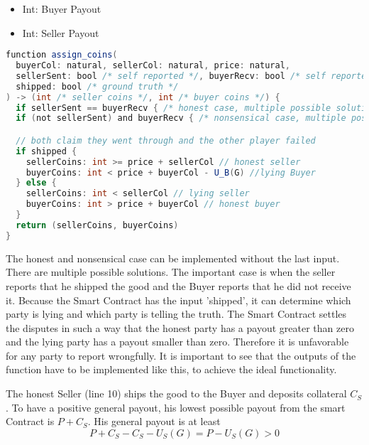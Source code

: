 \documentclass{cacthesis}
\begin{document}
\begin{itemize}
\item{Int: Buyer Payout}
\item{Int: Seller Payout}
\end{itemize}


\begin{lstlisting}[language=java]
function assign_coins(
  buyerCol: natural, sellerCol: natural, price: natural,
  sellerSent: bool /* self reported */, buyerRecv: bool /* self reported */, 
  shipped: bool /* ground truth */
) -> (int /* seller coins */, int /* buyer coins */) {
  if sellerSent == buyerRecv { /* honest case, multiple possible solutions  */ }
  if (not sellerSent) and buyerRecv { /* nonsensical case, multiple possible solutions */ }

  // both claim they went through and the other player failed
  if shipped {
    sellerCoins: int >= price + sellerCol // honest seller
    buyerCoins: int < price + buyerCol - U_B(G) //lying Buyer
  } else {
    sellerCoins: int < sellerCol // lying seller
    buyerCoins: int > price + buyerCol // honest buyer
  }
  return (sellerCoins, buyerCoins)
}
\end{lstlisting}
The honest and nonsensical case can be implemented without the last input. There are multiple possible solutions.\newline
The important case is when the seller reports that he shipped the good and the Buyer reports that he did not receive it. Because the Smart Contract has the input 'shipped', it can determine which party is lying and which party is telling the truth.\newline
The Smart Contract settles the disputes in such a way that the honest party has a payout greater than zero and the lying party has a payout smaller than zero. Therefore it is unfavorable for any party to report wrongfully.\newline
It is important to see that the outputs of the function have to be implemented like this, to achieve the ideal functionality.\newline

The honest Seller (line 10) ships the good to the Buyer and deposits collateral $C_S$. To have a positive general payout, his lowest possible payout from the smart Contract is $P + C_S$. His general payout is at least
\[P + C_S - C_S - U_S(G) = P - U_S(G) > 0\]
\end{document}
